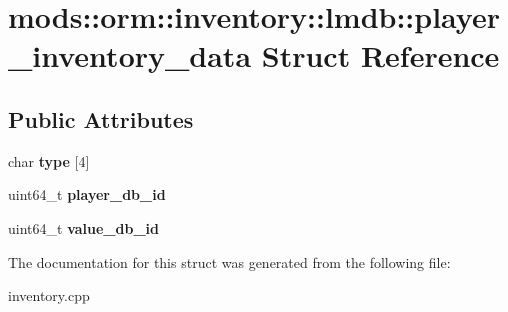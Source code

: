 \hypertarget{structmods_1_1orm_1_1inventory_1_1lmdb_1_1player__inventory__data}{}\section{mods\+:\+:orm\+:\+:inventory\+:\+:lmdb\+:\+:player\+\_\+inventory\+\_\+data Struct Reference}
\label{structmods_1_1orm_1_1inventory_1_1lmdb_1_1player__inventory__data}
\subsection*{Public Attributes}
\begin{DoxyCompactItemize}
\item 
\mbox{\label{structmods_1_1orm_1_1inventory_1_1lmdb_1_1player__inventory__data_ac5be354272e6cacf4928f0e2d6ec360d}} 
char {\bfseries type} \mbox{[}4\mbox{]}
\item 
\mbox{\label{structmods_1_1orm_1_1inventory_1_1lmdb_1_1player__inventory__data_a26f3f0c5294a3e7f0c482d07441b9e98}} 
uint64\+\_\+t {\bfseries player\+\_\+db\+\_\+id}
\item 
\mbox{\label{structmods_1_1orm_1_1inventory_1_1lmdb_1_1player__inventory__data_a4073f8c498d0b19384c0308e41ce161f}} 
uint64\+\_\+t {\bfseries value\+\_\+db\+\_\+id}
\end{DoxyCompactItemize}


The documentation for this struct was generated from the following file\+:\begin{DoxyCompactItemize}
\item 
inventory.\+cpp\end{DoxyCompactItemize}
